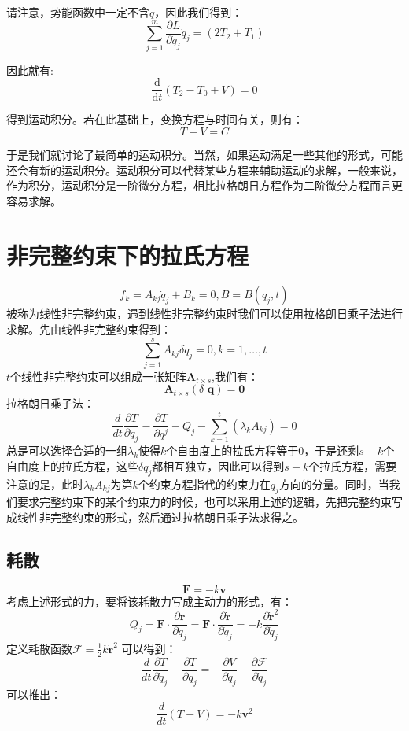\documentclass[a4paper, 10pt, openany]{book}%
\begin{document}
请注意，势能函数中一定不含$\dot{q}$，因此我们得到：
\begin{equation}
\sum_{j=1}^m\frac{\partial L}{\partial \dot{q}_j}\dot{q}_j=(2T_2+T_1)
\end{equation}

因此就有:
\begin{equation}
\frac{\mathrm{d}}{\mathrm{d}t}\left(T_2-T_0+V\right)=0
\end{equation}

得到运动积分。若在此基础上，变换方程与时间有关，则有：
    \begin{equation}T+V=C\end{equation}

    于是我们就讨论了最简单的运动积分。当然，如果运动满足一些其他的形式，可能还会有新的运动积分。运动积分可以代替某些方程来辅助运动的求解，一般来说，作为积分，运动积分是一阶微分方程，相比拉格朗日方程作为二阶微分方程而言更容易求解。
   
 \section{非完整约束下的拉氏方程}
    $$f_k=A_{kj}\dot{q}_j+B_k=0,B=B(q_j,t)$$
    被称为线性非完整约束，遇到线性非完整约束时我们可以使用拉格朗日乘子法进行求解。先由线性非完整约束得到：
    $$\sum_{j=1}^s A_{kj}\delta q_j=0,k=1,\dots,t$$
    $t$个线性非完整约束可以组成一张矩阵$\textbf{A}_{t\times s}$,我们有：
    $$\textbf{A}_{t\times s}(\delta\textbf{ q})=\textbf{0}$$
    拉格朗日乘子法：
    $$\frac{d}{dt}\frac{\partial T}{\partial \dot{q}_j}-\frac{\partial T}{\partial q^j}-Q_j-\sum_{k=1}^t(\lambda_kA_{kj})=0$$
    总是可以选择合适的一组$\lambda_k$使得$k$个自由度上的拉氏方程等于0，于是还剩$s-k$个自由度上的拉氏方程，这些$\delta q_j$都相互独立，因此可以得到$s-k$个拉氏方程，需要注意的是，此时$\lambda_kA_{kj}$为第$k$个约束方程指代的约束力在$q_j$方向的分量。同时，当我们要求完整约束下的某个约束力的时候，也可以采用上述的逻辑，先把完整约束写成线性非完整约束的形式，然后通过拉格朗日乘子法求得之。
     \subsection{耗散}
    $$\textbf{F}=-k\textbf{v}$$
    考虑上述形式的力，要将该耗散力写成主动力的形式，有：
     $$Q_j=\textbf{F}\cdot\frac{\partial \textbf{r}}{\partial q_j}=\textbf{F}\cdot\frac{\partial \dot{\textbf{r}}}{\partial \dot{q}_j}=-k\frac{\partial \dot{\textbf{r}}^2}{\partial \dot{q}_j}$$
    定义耗散函数$\mathcal{F}=\frac{1}{2}k\dot{\textbf{r}}^2$  可以得到：
    $$\frac{d}{dt}\frac{\partial T}{\partial \dot{q}_j}-\frac{\partial T}{\partial q_j}=-\frac{\partial V}{\partial \dot{q}_j}-\frac{\partial \mathcal{F}}{\partial \dot{q}_j}$$
    可以推出：
    $$\frac{d}{dt}(T+V)=-k\textbf{v}^2$$
\end{document}
